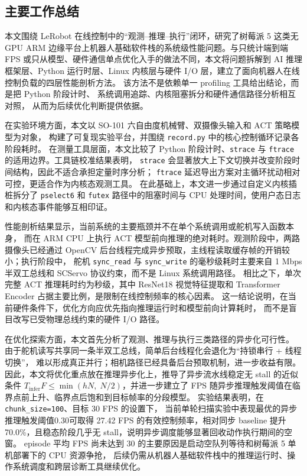 \subsection{主要工作总结}

本文围绕 LeRobot 在线控制中的``观测--推理--执行''闭环，研究了树莓派 5
这类无 GPU ARM 边缘平台上机器人基础软件栈的系统级性能问题。与只统计端到端
FPS 或只从模型、硬件通信单点优化入手的做法不同，本文将问题拆解到 AI 推理框架层、Python 运行时层、Linux
内核层与硬件 I/O 层，建立了面向机器人在线控制负载的四层性能剖析方法。
该方法不是依赖单一 profiling 工具给出结论，而是把 Python 阶段计时、
系统调用追踪、内核阻塞拆分和硬件通信路径分析相互对照，
从而为后续优化判断提供依据。

在实验环境方面，本文以 SO-101 六自由度机械臂、双摄像头输入和 ACT 策略模型为对象，
构建了可复现实验平台，并围绕 \texttt{record.py} 中的核心控制循环记录各阶段耗时。
在测量工具层面，本文比较了 Python 阶段计时、\texttt{strace}
与 \texttt{ftrace} 的适用边界。工具链校准结果表明，
\texttt{strace} 会显著放大上下文切换并改变阶段时间结构，因此不适合承担定量时序分析；
\texttt{ftrace} 延迟导出方案对主循环扰动相对可控，更适合作为内核态观测工具。
在此基础上，本文进一步通过自定义内核插桩拆分了 \texttt{pselect6} 和
\texttt{futex} 路径中的阻塞时间与 CPU 处理时间，使用户态日志和内核态事件能够互相印证。

性能剖析结果显示，当前系统的主要瓶颈并不在单个系统调用或舵机写入函数本身，
而在 ARM CPU 上执行 ACT 模型前向推理的绝对耗时。观测阶段中，两路摄像头已经通过
OpenCV 后台线程完成异步预取，主线程读取缓存帧的开销较小；执行阶段中，
舵机 \texttt{sync\_read} 与 \texttt{sync\_write} 的毫秒级耗时主要来自
1 Mbps 半双工总线和 SCServo 协议约束，而不是 Linux 系统调用路径。
相比之下，单次完整 ACT 推理耗时约为秒级，其中 ResNet18 视觉特征提取和
Transformer Encoder 占据主要比例，是限制在线控制频率的核心因素。
这一结论说明，在当前硬件条件下，优化方向应优先指向推理运行时和模型前向计算耗时，
而不是盲目改写已受物理总线约束的硬件 I/O 路径。

在优化探索方面，本文首先分析了观测、推理与执行三类路径的异步化可行性。
由于舵机读写共享同一条半双工总线，简单后台线程化会退化为``持锁串行 + 线程切换''，
难以形成真正并行；相机路径已经具备后台预取机制，进一步收益有限。
因此，本文将优化重点放在推理异步化上，推导了异步流水线稳定无 stall 的近似条件
\(T_{\text{infer}}F \leq \min(hN,\;N/2)\)，并进一步建立了
FPS 随异步推理触发阈值在临界点前上升、临界点后饱和到目标帧率的分段模型。
实验结果表明，在 \texttt{chunk\_size=100}、目标 30 FPS 的设置下，
当前单轮扫描实验中表现最优的异步推理触发阈值0.30可取得 27.42 FPS 的有效控制频率，相对同步 baseline
提升 70.0\%，且稳态阶段几乎无 stall，说明异步调度能够显著回收动作执行期间的空窗。
episode 平均 FPS 尚未达到 30 的主要原因是启动空队列等待和树莓派 5 单机部署下的 CPU 资源争抢，
后续仍需从机器人基础软件栈中的推理运行时、操作系统调度和跨层诊断工具继续优化。
